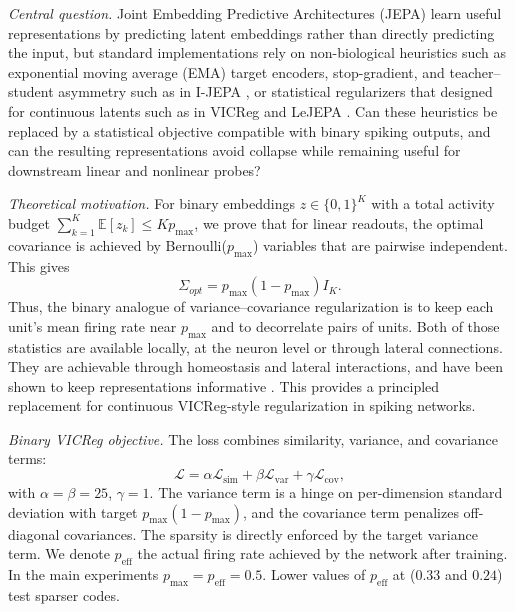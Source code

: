 \documentclass[12pt]{article}
\begin{document}
\begin{NoHyper}
    \emph{Central question.}
    Joint Embedding Predictive Architectures (JEPA) learn useful representations by predicting latent embeddings
    rather than directly predicting the input, but standard implementations rely on non-biological heuristics such as exponential
    moving average (EMA) target encoders, stop-gradient, and teacher--student asymmetry such as in I-JEPA \cite{I-JEPA}, or statistical
    regularizers that designed for continuous latents such as in VICReg \citep{VICReg} and LeJEPA \citep{LeJEPA}.
    Can these heuristics be replaced by a statistical objective compatible with binary spiking outputs,
    and can the resulting representations avoid collapse while remaining useful for downstream
    linear and nonlinear probes? \vspace{3pt}

    \emph{Theoretical motivation.}
    For binary embeddings \(z\in \{0,1\}^{K}\) with a total activity budget \(\sum_{k=1}^{K}\mathbb{E}[z_k]\leq K p_{\max}\),
    we prove that for linear readouts, the optimal covariance is achieved by Bernoulli(\(p_{\max}\)) variables that are pairwise independent. This gives
    \[
        \Sigma_{opt}=p_{\max}(1-p_{\max})I_K.
    \]
    Thus, the binary analogue of variance--covariance regularization is to keep each unit's mean firing rate
    near \(p_{\max}\) and to decorrelate pairs of units. Both of those statistics are available locally, at the neuron level or through lateral connections.
    They are achievable through homeostasis and lateral interactions, and have been shown to keep representations informative \citep{Foldiak} \citep{Grimaldi}.
    This provides a principled replacement for continuous VICReg-style \citep{VICReg} regularization in spiking networks. \vspace{3pt}

    \emph{Binary VICReg objective.}
    The loss combines similarity, variance, and covariance terms:
    \[
        \mathcal{L}=\alpha\mathcal{L}_{\text{sim}}+\beta\mathcal{L}_{\text{var}}+\gamma\mathcal{L}_{\text{cov}},
    \]
    with \(\alpha=\beta=25\), \(\gamma=1\). The variance term is a hinge on per-dimension standard deviation with target
    \(p_{\max}(1-p_{\max})\), and the covariance term penalizes off-diagonal covariances. The sparsity is directly enforced by
    the target variance term. We denote \(p_{\text{eff}}\) the actual firing rate achieved by the network after training.
    In the main experiments \(p_{\max}=p_{\text{eff}}=0.5\). Lower values of \(p_{\text{eff}}\) at (\(0.33\) and \(0.24\)) test sparser codes. \vspace{3pt}


\end{NoHyper}
\end{document}
